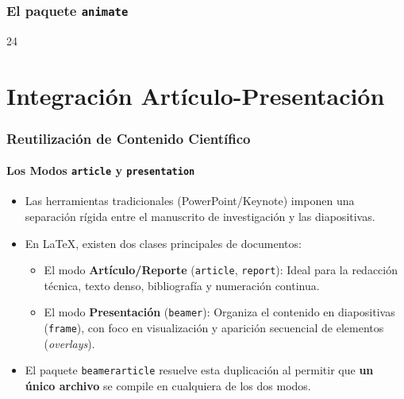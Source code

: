 \documentclass[12pt,aspectratio=169,ignorenonframetext]{ltxbeamer}
\begin{document}
\begin{frame}[fragile]
\frametitle{El paquete \texttt{animate}}

\begin{center}
    \begin{animateinline}[autoplay,loop,nomouse,poster=first]{24}
    \end{animateinline}
\end{center}
\end{frame}




\section{Integración Artículo-Presentación}

\begin{frame}
\frametitle{Reutilización de Contenido Científico}
\framesubtitle{Los Modos \texttt{article} y \texttt{presentation}}

\begin{itemize}[<+->]
    \item Las herramientas tradicionales (PowerPoint/Keynote) imponen una separación rígida entre el manuscrito de investigación y las diapositivas.
    \item En {\lmr\LaTeX}, existen dos clases principales de documentos:
    \begin{itemize}
        \item El modo \textbf{Artículo/Reporte} (\texttt{article}, \texttt{report}): Ideal para la redacción técnica, texto denso, bibliografía y numeración continua.
        \item El modo \textbf{Presentación} (\texttt{beamer}): Organiza el contenido en diapositivas (\texttt{frame}), con foco en visualización y aparición secuencial de elementos (\emph{overlays}).
    \end{itemize}
    \item El paquete \texttt{beamerarticle} resuelve esta duplicación al permitir que \textbf{un único archivo} se compile en cualquiera de los dos modos.
\end{itemize}
\end{frame}
\end{document}
